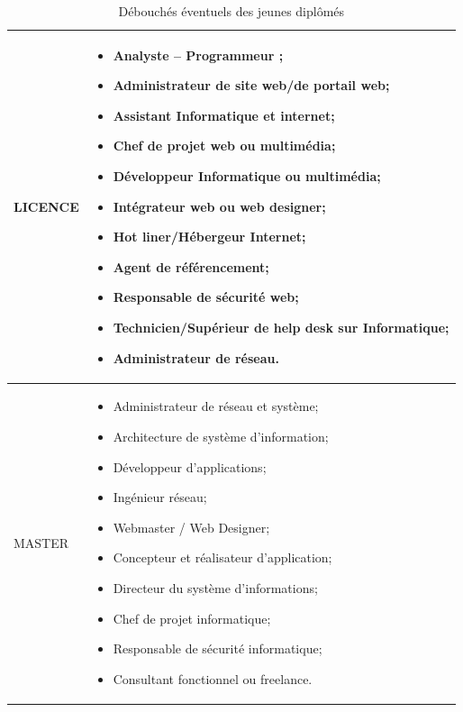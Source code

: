 \documentclass[12pt]{report}
\begin{document}
				\begin{longtable}{|p{5cm}|p{10cm}|}
				\caption{Débouchés éventuels des jeunes diplômés}
			  	\label{tab:debouchesENI}\\
				\hline
				\endfirsthead
				\endhead
				      LICENCE & 
				      \begin{itemize}
				        \item Analyste – Programmeur ;
				        \item Administrateur de site web/de portail web;
				        \item Assistant Informatique et internet;
				        \item Chef de projet web ou multimédia;
				        \item Développeur Informatique ou multimédia;
				        \item Intégrateur web ou web designer;
				        \item Hot liner/Hébergeur Internet;
				        \item Agent de référencement;
				        \item Responsable de sécurité web;
				        \item Technicien/Supérieur de help desk sur Informatique;
				        \item Administrateur de réseau.
				      \end{itemize} \\
				      \hline
				     MASTER & 
				      \begin{itemize}
				        \item Administrateur de réseau et système;
				        \item Architecture de système d’information;
				        \item Développeur d’applications;
				        \item Ingénieur réseau;
				        \item Webmaster / Web Designer;
				        \item Concepteur et réalisateur d’application;
				        \item Directeur du système d’informations;
				        \item Chef de projet informatique;
				        \item Responsable de sécurité informatique;
				        \item Consultant fonctionnel ou freelance.
				      \end{itemize} \\
				      \hline
				\end{longtable}
				\FloatBarrier			
\end{document}
